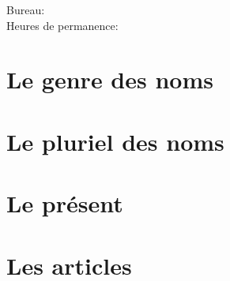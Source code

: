 \documentclass{beamer}
\subtitle[Révision]{La révision}
\begin{document}
  \begin{frame}
    \titlepage
    \tiny{Bureau: \\
          Heures de permanence: }
  \end{frame}
  
  \begin{frame}
    \hypertarget{début}{}
    \tableofcontents[hideallsubsections]
  \end{frame}

  \section{Le genre des noms}
  \section{Le pluriel des noms}
  \section{Le présent}
  \section{Les articles}
\end{document}
